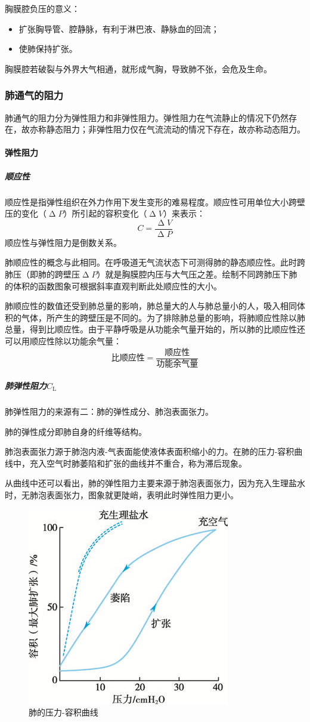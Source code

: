 胸膜腔负压的意义：
\begin{itemize}
	\item 扩张胸导管、腔静脉，有利于淋巴液、静脉血的回流；
	\item 使肺保持扩张。
\end{itemize}

胸膜腔若破裂与外界大气相通，就形成气胸，导致肺不张，会危及生命。

\subsubsection{肺通气的阻力}

肺通气的阻力分为弹性阻力和非弹性阻力。弹性阻力在气流静止的情况下仍然存在，故亦称静态阻力；非弹性阻力仅在气流流动的情况下存在，故亦称动态阻力。

\paragraph{弹性阻力}

\subparagraph{顺应性}

顺应性是指弹性组织在外力作用下发生变形的难易程度。顺应性可用单位大小跨壁压的变化（$\upDelta P$）所引起的容积变化（$\upDelta V$）来表示：\[C=\frac{\upDelta V}{\upDelta P}\]
顺应性与弹性阻力是倒数关系。

肺顺应性的概念与此相同。在呼吸道无气流状态下可测得肺的静态顺应性。此时跨肺压（即肺的跨壁压$\upDelta P$）就是胸膜腔内压与大气压之差。绘制不同跨肺压下肺的体积的函数图象可根据斜率直观判断此处顺应性的大小。

肺顺应性的数值还受到肺总量的影响，肺总量大的人与肺总量小的人，吸入相同体积的气体，所产生的跨壁压是不同的。为了排除肺总量的影响，将肺顺应性除以肺总量，得到比顺应性。由于平静呼吸是从功能余气量开始的，所以肺的比顺应性还可以用顺应性除以功能余气量：\[\text{比顺应性}=\frac{\text{顺应性}}{\text{功能余气量}}\]

\subparagraph{肺弹性阻力$C_{\text{L}}$}

肺弹性阻力的来源有二：肺的弹性成分、肺泡表面张力。

肺的弹性成分即肺自身的纤维等结构。

肺泡表面张力源于肺泡内液-气表面能使液体表面积缩小的力。在肺的压力-容积曲线中，充入空气时肺萎陷和扩张的曲线并不重合，称为滞后现象。

从曲线中还可以看出，肺的弹性阻力主要来源于肺泡表面张力，因为充入生理盐水时，无肺泡表面张力，图象就更陡峭，表明此时弹性阻力更小。

\begin{figure}[htbp]
	\centering
	\includegraphics[width=0.3\linewidth]{Pics/肺的压力-容积曲线}
	\caption{肺的压力-容积曲线}
	\label{fig:p-v_curve_lung}
\end{figure}

